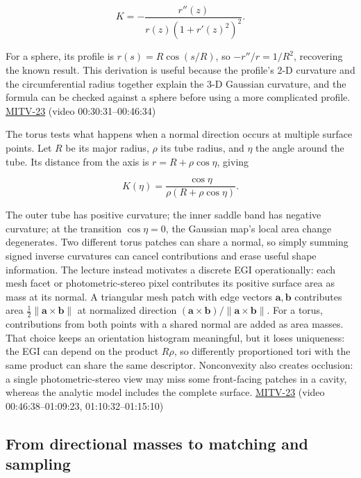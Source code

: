 \[
K=-\frac{r''(z)}{r(z)\left(1+r'(z)^2\right)^2}.
\]

For a sphere, its profile is \(r(s)=R\cos(s/R)\), so \(-r''/r=1/R^2\), recovering the known result. This derivation is useful because the profile's 2-D curvature and the circumferential radius together explain the 3-D Gaussian curvature, and the formula can be checked against a sphere before using a more complicated profile. \hyperref[04-visual-computing-ii-ch036-mitv-23---gaussian-image-solids-of-revolution-direction-histograms-regular-polyhedra]{MITV-23} (video 00:30:31--00:46:34)

The torus tests what happens when a normal direction occurs at multiple surface points. Let \(R\) be its major radius, \(\rho\) its tube radius, and \(\eta\) the angle around the tube. Its distance from the axis is \(r=R+\rho\cos\eta\), giving

\[
K(\eta)=\frac{\cos\eta}{\rho(R+\rho\cos\eta)}.
\]

The outer tube has positive curvature; the inner saddle band has negative curvature; at the transition \(\cos\eta=0\), the Gaussian map's local area change degenerates. Two different torus patches can share a normal, so simply summing signed inverse curvatures can cancel contributions and erase useful shape information. The lecture instead motivates a discrete EGI operationally: each mesh facet or photometric-stereo pixel contributes its positive surface area as mass at its normal. A triangular mesh patch with edge vectors \(\mathbf a,\mathbf b\) contributes area \(\tfrac12\|\mathbf a\times\mathbf b\|\) at normalized direction \((\mathbf a\times\mathbf b)/\|\mathbf a\times\mathbf b\|\). For a torus, contributions from both points with a shared normal are added as area masses. That choice keeps an orientation histogram meaningful, but it loses uniqueness: the EGI can depend on the product \(R\rho\), so differently proportioned tori with the same product can share the same descriptor. Nonconvexity also creates occlusion: a single photometric-stereo view may miss some front-facing patches in a cavity, whereas the analytic model includes the complete surface. \hyperref[04-visual-computing-ii-ch036-mitv-23---gaussian-image-solids-of-revolution-direction-histograms-regular-polyhedra]{MITV-23} (video 00:46:38--01:09:23, 01:10:32--01:15:10)

\subsection{From directional masses to matching and sampling}\label{04-visual-computing-ii-ch032-from-directional-masses-to-matching-and-sampling}

